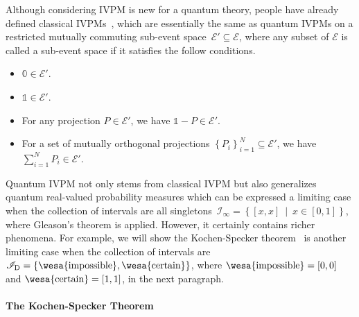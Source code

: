 \documentclass[english,reprint, aps, prl,superscriptaddress, showpacs,
showkeys]{revtex4-1}
\theoremstyle{plain}
\theoremstyle{definition}
\newcommand{\events}{\ensuremath{\mathcal{E}}}
\newcommand{\imposs}{{\mbox{\wesa{impossible}}}}
\newcommand{\necess}{{\mbox{\wesa{certain}}}}
\newcommand{\set}[2]{\ensuremath{\left\{ {#1}~\middle|~{#2}\right\} }}
\begin{document}
Although considering IVPM is new for a quantum theory, people have
already defined classical IVPMs~\citep{JamisonLodwick2004}, which
are essentially the same as quantum IVPMs on a restricted mutually
commuting sub-event space~$\events'\subseteq\events$, where any
subset of $\events$ is called a sub-event space if it satisfies the
follow conditions.
\begin{itemize}
\item $\mathbb{0}\in\events'$.
\item $\mathbb{1}\in\events'$.
\item For any projection $P\in\events'$, we have $\mathbb{1}-P\in\events'$.
\item For a set of mutually orthogonal projections $\left\{ P_{i}\right\} _{i=1}^{N}\subseteq\events'$,
we have $\sum_{i=1}^{N}P_{i}\in\events'$.
\end{itemize}
Quantum IVPM not only stems from classical IVPM but also generalizes
quantum real-valued probability measures which can be expressed a
limiting case when the collection of intervals are all singletons~$\mathscr{I}_{\infty}=\set{\left[x,x\right]}{x\in\left[0,1\right]}$,
where Gleason's theorem is applied. However, it certainly contains
richer phenomena. For example, we will show the Kochen-Specker theorem~\citep{kochenspecker1967,peres1995quantum,Redhead1987-REDINA}
is another limiting case when the collection of intervals are $\mathscr{I}_{\mathrm{D}}=\left\{ \imposs,\necess\right\} $,
where $\imposs=\left[0,0\right]$ and $\necess=\left[1,1\right]$,
in the next paragraph.

\paragraph{The Kochen-Specker Theorem}
\end{document}
